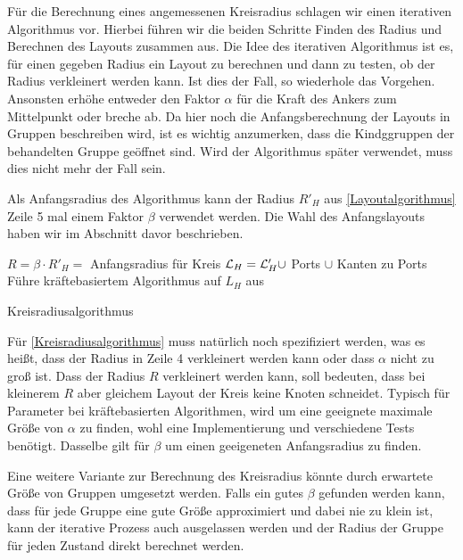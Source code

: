 Für die Berechnung eines angemessenen Kreisradius schlagen wir einen iterativen Algorithmus vor. \label{Radius}
Hierbei führen wir die beiden Schritte Finden des Radius und Berechnen des Layouts zusammen aus.
Die Idee des iterativen Algorithmus ist es, für einen gegeben Radius ein Layout zu berechnen und dann zu testen, ob der Radius verkleinert werden kann.
Ist dies der Fall, so wiederhole das Vorgehen. Ansonsten erhöhe entweder den Faktor $\alpha$ für die Kraft des Ankers zum Mittelpunkt oder breche ab. 
Da hier noch die Anfangsberechnung der Layouts in Gruppen beschreiben wird, ist es wichtig anzumerken, dass die Kindggruppen der behandelten Gruppe geöffnet sind.
Wird der Algorithmus später verwendet, muss dies nicht mehr der Fall sein.

Als Anfangsradius des Algorithmus kann der Radius $R'_H$ aus \autoref{Layoutalgorithmus} Zeile 5 mal einem Faktor $\beta$ verwendet werden.
Die Wahl des Anfangslayouts haben wir im Abschnitt davor beschrieben.

\begin{algorithm}[H]
\label{Kreisradiusalgorithmus}
\SetAlgoLined
{}
$R = \beta \cdot R'_H = $ Anfangsradius für Kreis\;
$\mathcal{L}_H = \mathcal{L}'_H \cup$ Ports $\cup$  Kanten zu Ports\;
Führe kräftebasiertem Algorithmus auf  $L_H$ aus\;
\caption{Kreisradiusalgorithmus}
\end{algorithm}

Für \autoref{Kreisradiusalgorithmus} muss natürlich noch spezifiziert werden, was es heißt, dass der Radius in Zeile 4 verkleinert werden kann
oder dass $\alpha$ nicht zu groß ist. 
Dass der Radius $R$ verkleinert werden kann, soll bedeuten, dass bei kleinerem $R$ aber gleichem Layout der Kreis keine Knoten schneidet. 
Typisch für Parameter bei kräftebasierten Algorithmen, wird um eine geeignete maximale Größe von $\alpha$ zu finden, wohl eine Implementierung und verschiedene Tests benötigt. 
Dasselbe gilt für $\beta$ um einen geeigeneten Anfangsradius zu finden.

Eine weitere Variante zur Berechnung des Kreisradius könnte durch erwartete Größe von Gruppen umgesetzt werden. 
Falls ein gutes $\beta$ gefunden werden kann, dass für jede Gruppe eine gute Größe approximiert und dabei nie zu klein ist, kann der iterative Prozess auch ausgelassen werden
und der Radius der Gruppe für jeden Zustand direkt berechnet werden.			

